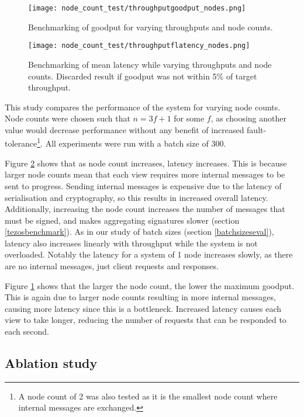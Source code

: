 \begin{figure}[h!]
\centering
\texttt{[image: node\_count\_test/throughputgoodput\_nodes.png]}
\caption{Benchmarking of goodput for varying throughputs and node counts.}
\label{throughputgoodputnodes}
\end{figure}

\begin{figure}[h!]
\centering
\texttt{[image: node\_count\_test/throughputflatency\_nodes.png]}
\caption{Benchmarking of mean latency while varying throughputs and node counts. Discarded result if goodput was not within 5\% of target throughput.}
\label{throughputlatencynodes}
\end{figure}

This study compares the performance of the system for varying node counts. Node counts were chosen such that $n = 3f + 1$ for some $f$, as choosing another value would decrease performance without any benefit of increased fault-tolerance\footnote{A node count of 2 was also tested as it is the smallest node count where internal messages are exchanged.}. All experiments were run with a batch size of 300.

Figure \ref{throughputlatencynodes} shows that as node count increases, latency increases. This is because larger node counts mean that each view requires more internal messages to be sent to progress. Sending internal messages is expensive due to the latency of serialisation and cryptography, so this results in increased overall latency. Additionally, increasing the node count increases the number of messages that must be signed, and makes aggregating signatures slower (section \ref{tezosbenchmark}). As in our study of batch sizes (section \ref{batchsizeseval}), latency also increases linearly with throughput while the system is not overloaded. Notably the latency for a system of 1 node increases slowly, as there are no internal messages, just client requests and responses.

Figure \ref{throughputgoodputnodes} shows that the larger the node count, the lower the maximum goodput. This is again due to larger node counts resulting in more internal messages, causing more latency since this is a bottleneck. Increased latency causes each view to take longer, reducing the number of requests that can be responded to each second.

\subsection{Ablation study} \label{ablation}

